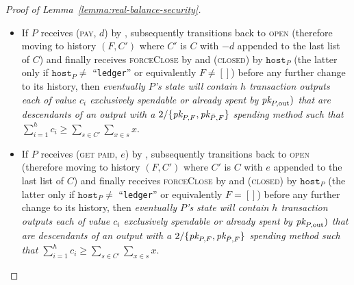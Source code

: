 \begin{proof}[Proof of Lemma~\ref{lemma:real-balance-security}]
\begin{itemize}
    change to its history, then \emph{eventually $P$'s \ledger state will
    contain $h$ transaction outputs each of value $c_i$ exclusively spendable or
    already spent by $\pk{P, \mathrm{out}})$ that are descendants of an output
    with spending method $2/\{\pk{P, F}, \pk{\bar{P}, F}\}$ such that
    $\sum\limits_{i=1}^h c_i \geq \sum\limits_{s \in C} \sum\limits_{x \in s}
    x$}. Furthermore, given that $P$ moves to the \textsc{open} state after the
    (\textsc{virtualising}, $\dots$) message and in case it sends
    (\textsc{funded}, $\dots$) to some party $R$
    (Fig.~\ref{code:ln:virtualise:start-end},
    l.~\ref{code:ln:virtualise:start-end:helper-output-funded}), the latter
    party is the (local, kindred) \texttt{fundee} of a new virtual channel. If
    subsequently the state of $R$ transitions to \textsc{open} (therefore
    obtaining history $(F_R, C_R)$ where $F_R = F + C$ and $C_R = [[0]]$), and
    finally receives (\textsc{forceClose}) by \environment and (\textsc{closed}) by
    $\texttt{host}_R$ ($\texttt{host}_R = \texttt{host}_P$ --
    Fig.~\ref{code:ln:bob}, l.~\ref{code:ln:bob:host}) before any further change
    to its history, then \emph{eventually $R$'s \ledger state will contain an
    output with a $2/\{\pk{R, F}, \pk{\bar{R}, F}\}$ spending method.}
    \item If $P$ receives (\textsc{pay}, $d$) by \environment, subsequently
    transitions back to \textsc{open} (therefore moving to history $(F, C')$
    where $C'$ is $C$ with $-d$ appended to the last list of $C$) and finally
    receives \textsc{forceClose} by \environment and (\textsc{closed}) by
    $\texttt{host}_P$ (the latter only if $\texttt{host}_P \neq$ ``\texttt{ledger}'' or
    equivalently $F \neq []$) before any further change to its history, then
    \emph{eventually $P$'s \ledger state will contain $h$ transaction outputs
    each of value $c_i$ exclusively spendable or already spent by $\pk{P,
    \mathrm{out}})$ that are descendants of an output with a $2/\{\pk{P, F},
    \pk{\bar{P}, F}\}$ spending method such that $\sum\limits_{i=1}^h c_i \geq
    \sum\limits_{s \in C'} \sum\limits_{x \in s} x$}.
    \item If $P$ receives (\textsc{get paid}, $e$) by \environment, subsequently
    transitions back to \textsc{open} (therefore moving to history $(F, C')$
    where $C'$ is $C$ with $e$ appended to the last list of $C$) and finally
    receives \textsc{forceClose} by \environment and (\textsc{closed}) by
    $\texttt{host}_P$ (the latter only if $\texttt{host}_P \neq$ ``\texttt{ledger}'' or
    equivalently $F = []$) before any further change to its history, then
    \emph{eventually $P$'s \ledger state will contain $h$ transaction outputs
    each of value $c_i$ exclusively spendable or already spent by $\pk{P,
    \mathrm{out}})$ that are descendants of an output with a $2/\{\pk{P, F},
    \pk{\bar{P}, F}\}$ spending method such that $\sum\limits_{i=1}^h c_i \geq
    \sum\limits_{s \in C'} \sum\limits_{x \in s} x$}.
  \end{itemize}


\end{proof}
